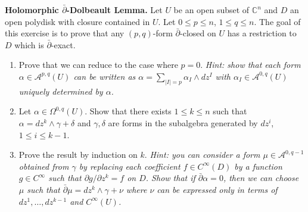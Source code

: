 \documentclass[12pt]{article}
\begin{document}
\begin{problem}{3}
\textbf{Holomorphic $\bar{\partial}$-Dolbeault Lemma.} Let $U$ be an open subset of $\mathbb{C}^n$ and $D$ an open polydisk with closure contained in $U$. Let $0 \le p \le n$, $1 \le q \le n$. The goal of this exercise is to prove that any $(p, q)$-form $\bar{\partial}$-closed on $U$ has a restriction to $D$ which is $\bar{\partial}$-exact.

\begin{enumerate}
    \item Prove that we can reduce to the case where $p = 0$. \textit{Hint: show that each form $\alpha \in \mathcal{A}^{p,q}(U)$ can be written as $\alpha = \sum_{|I|=p} \alpha_I \wedge dz^I$ with $\alpha_I \in \mathcal{A}^{0,q}(U)$ uniquely determined by $\alpha$.}

    \item Let $\alpha \in \Omega^{0,q}(U)$. Show that there exists $1 \le k \le n$ such that $\alpha = dz^k \wedge \gamma + \delta$ and $\gamma, \delta$ are forms in the subalgebra generated by $dz^i$, $1 \le i \le k - 1$.

    \item Prove the result by induction on $k$. \textit{Hint: you can consider a form $\mu \in \mathcal{A}^{0,q-1}$ obtained from $\gamma$ by replacing each coefficient $f \in C^\infty(D)$ by a function $g \in C^\infty$ such that $\partial g/\partial z^k = f$ on $D$. Show that if $\bar{\partial}\alpha = 0$, then we can choose $\mu$ such that $\bar{\partial}\mu = dz^k \wedge \gamma + \nu$ where $\nu$ can be expressed only in terms of $dz^1, \dots, dz^{k-1}$ and $C^\infty(U)$.}
\end{enumerate}
\end{problem}
\begin{solution}

\end{solution}
\newpage
\end{document}
